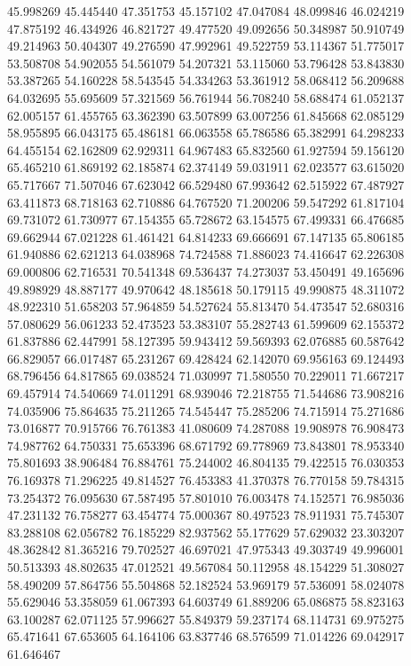 45.998269
45.445440
47.351753
45.157102
47.047084
48.099846
46.024219
47.875192
46.434926
46.821727
49.477520
49.092656
50.348987
50.910749
49.214963
50.404307
49.276590
47.992961
49.522759
53.114367
51.775017
53.508708
54.902055
54.561079
54.207321
53.115060
53.796428
53.843830
53.387265
54.160228
58.543545
54.334263
53.361912
58.068412
56.209688
64.032695
55.695609
57.321569
56.761944
56.708240
58.688474
61.052137
62.005157
61.455765
63.362390
63.507899
63.007256
61.845668
62.085129
58.955895
66.043175
65.486181
66.063558
65.786586
65.382991
64.298233
64.455154
62.162809
62.929311
64.967483
65.832560
61.927594
59.156120
65.465210
61.869192
62.185874
62.374149
59.031911
62.023577
63.615020
65.717667
71.507046
67.623042
66.529480
67.993642
62.515922
67.487927
63.411873
68.718163
62.710886
64.767520
71.200206
59.547292
61.817104
69.731072
61.730977
67.154355
65.728672
63.154575
67.499331
66.476685
69.662944
67.021228
61.461421
64.814233
69.666691
67.147135
65.806185
61.940886
62.621213
64.038968
74.724588
71.886023
74.416647
62.226308
69.000806
62.716531
70.541348
69.536437
74.273037
53.450491
49.165696
49.898929
48.887177
49.970642
48.185618
50.179115
49.990875
48.311072
48.922310
51.658203
57.964859
54.527624
55.813470
54.473547
52.680316
57.080629
56.061233
52.473523
53.383107
55.282743
61.599609
62.155372
61.837886
62.447991
58.127395
59.943412
59.569393
62.076885
60.587642
66.829057
66.017487
65.231267
69.428424
62.142070
69.956163
69.124493
68.796456
64.817865
69.038524
71.030997
71.580550
70.229011
71.667217
69.457914
74.540669
74.011291
68.939046
72.218755
71.544686
73.908216
74.035906
75.864635
75.211265
74.545447
75.285206
74.715914
75.271686
73.016877
70.915766
76.761383
41.080609
74.287088
19.908978
76.908473
74.987762
64.750331
75.653396
68.671792
69.778969
73.843801
78.953340
75.801693
38.906484
76.884761
75.244002
46.804135
79.422515
76.030353
76.169378
71.296225
49.814527
76.453383
41.370378
76.770158
59.784315
73.254372
76.095630
67.587495
57.801010
76.003478
74.152571
76.985036
47.231132
76.758277
63.454774
75.000367
80.497523
78.911931
75.745307
83.288108
62.056782
76.185229
82.937562
55.177629
57.629032
23.303207
48.362842
81.365216
79.702527
46.697021
47.975343
49.303749
49.996001
50.513393
48.802635
47.012521
49.567084
50.112958
48.154229
51.308027
58.490209
57.864756
55.504868
52.182524
53.969179
57.536091
58.024078
55.629046
53.358059
61.067393
64.603749
61.889206
65.086875
58.823163
63.100287
62.071125
57.996627
55.849379
59.237174
68.114731
69.975275
65.471641
67.653605
64.164106
63.837746
68.576599
71.014226
69.042917
61.646467
